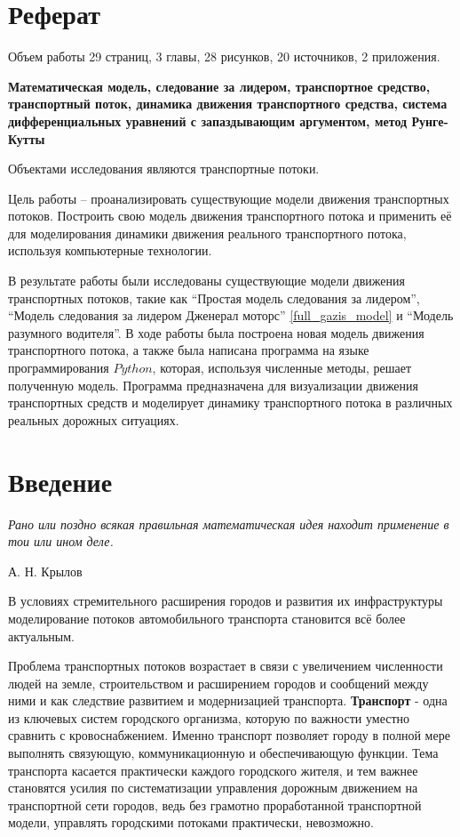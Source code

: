 \documentclass[12pt, a4paper]{extarticle}
\numberwithin{equation}{section}
\numberwithin{figure}{section}
\begin{document}
\justify 
\setlength{\parindent}{1.25cm} 
\newpage 
\thispagestyle{empty} 

\section*{Реферат}
\vspace{\baselineskip}	
Объем работы 29 страниц, 3 главы, 28 рисунков, 20 источников, 2 приложения.

\textbf{Математическая модель, следование за лидером, транспортное средство, транспортный поток, динамика движения транспортного средства, система дифференциальных уравнений с запаздывающим аргументом, метод Рунге-Кутты}

Объектами исследования являются транспортные потоки.

Цель работы – проанализировать существующие модели движения транспортных потоков. Построить свою модель движения транспортного потока и применить её для моделирования динамики движения реального транспортного потока, используя компьютерные технологии.                                          

В результате работы были исследованы существующие модели движения транспортных потоков, такие как ``Простая модель следования за лидером'', ``Модель следования за лидером Дженерал моторс''  \eqref{full_gazis_model} и ``Модель разумного водителя''. В ходе работы была построена новая модель движения транспортного потока, а также была написана программа на языке программирования $Python$, которая, используя численные методы, решает полученную модель. Программа предназначена для визуализации движения транспортных средств и моделирует динамику транспортного потока в различных реальных дорожных ситуациях.

\newpage

\setcounter{page}{2}

\tableofcontents 
\newpage 

\section*{Введение}
\epigraph{\textit{Рано или поздно всякая правильная математическая идея находит применение в тои или ином деле.}}
{А. Н. Крылов}
В условиях стремительного расширения городов и развития их инфраструктуры моделирование потоков автомобильного транспорта становится всё более актуальным. 

Проблема транспортных потоков возрастает в связи с увеличением численности людей на земле, строительством и расширением городов и сообщений между ними и как следствие развитием и модернизацией транспорта.  \textbf{Транспорт} - одна из ключевых систем городского организма, которую по важности уместно сравнить с кровоснабжением. Именно транспорт позволяет городу в полной мере выполнять связующую, коммуникационную и обеспечивающую функции. Тема транспорта касается практически каждого городского жителя, и тем важнее становятся усилия по систематизации управления дорожным движением на транспортной сети городов, ведь без грамотно проработанной транспортной модели, управлять городскими потоками практически, невозможно. 
\end{document}
